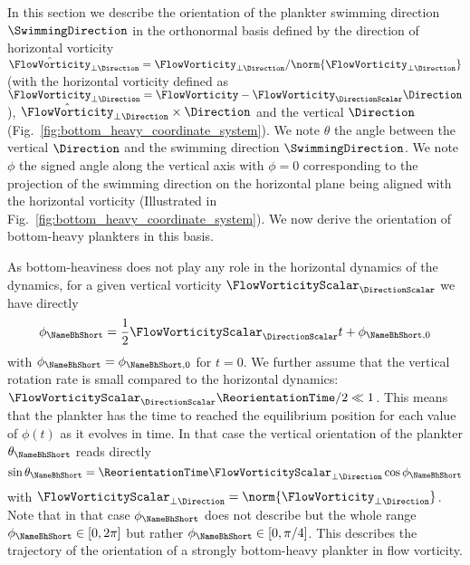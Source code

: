 In this section we describe the orientation of the plankter swimming direction $\SwimmingDirection$ in the orthonormal basis defined by the direction of horizontal vorticity $\hat{\FlowVorticity}_{\perp \Direction} = \FlowVorticity_{\perp \Direction} / \norm{\FlowVorticity_{\perp \Direction}}$ (with the horizontal vorticity defined as $\FlowVorticity_{\perp \Direction} = \FlowVorticity - \FlowVorticity_\DirectionScalar \Direction$), $\hat{\FlowVorticity}_{\perp \Direction} \times \Direction$ and the vertical $\Direction$ (Fig.~\ref{fig:bottom_heavy_coordinate_system}).
We note $\theta$ the angle between the vertical $\Direction$ and the swimming direction $\SwimmingDirection$.
We note $\phi$ the signed angle along the vertical axis with $\phi = 0$ corresponding to the projection of the swimming direction on the horizontal plane being aligned with the horizontal vorticity (Illustrated in Fig.~\ref{fig:bottom_heavy_coordinate_system}).
We now derive the orientation of bottom-heavy plankters in this basis.

As bottom-heaviness does not play any role in the horizontal dynamics of the dynamics, for a given vertical vorticity $\FlowVorticityScalar_{\DirectionScalar}$ we have directly
\begin{equation}\label{app:eq:spherical_bottom_phi}
	\phi_{\mathrm{\NameBhShort}} = \frac{1}{2} \FlowVorticityScalar_{\DirectionScalar} t + \phi_{\mathrm{\NameBhShort}, 0}
\end{equation}
with $\phi_{\mathrm{\NameBhShort}} = \phi_{\mathrm{\NameBhShort}, 0}$ for $t = 0$.
We further assume that the vertical rotation rate is small compared to the horizontal dynamics: $\FlowVorticityScalar_{\DirectionScalar} \ReorientationTime / 2 \ll 1$.
This means that the plankter has the time to reached the equilibrium position for each value of $\phi(t)$ as it evolves in time.
In that case the vertical orientation of the plankter $\theta_{\mathrm{\NameBhShort}}$ reads directly
\begin{equation}\label{app:eq:spherical_bottom_heavy_theta}
	\sin \theta_{\mathrm{\NameBhShort}} = \ReorientationTime \FlowVorticityScalar_{\perp \Direction} \cos \phi_{\mathrm{\NameBhShort}}
\end{equation}
with $\FlowVorticityScalar_{\perp \Direction} = \norm{\FlowVorticity_{\perp \Direction}}$.
Note that in that case $\phi_{\mathrm{\NameBhShort}}$ does not describe but the whole range $\phi_{\mathrm{\NameBhShort}} \in [0, 2\pi]$ but rather $\phi_{\mathrm{\NameBhShort}} \in [0, \pi/4]$.
This describes the trajectory of the orientation of a strongly bottom-heavy plankter in flow vorticity.

